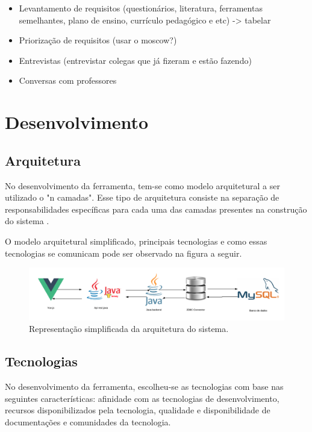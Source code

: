 \begin{itemize}
	\item Levantamento de requisitos (questionários, literatura, ferramentas semelhantes, plano de ensino, currículo pedagógico e etc) -> tabelar
	\item Priorização de requisitos (usar o moscow?)
	\item Entrevistas (entrevistar colegas que já fizeram e estão fazendo)
	\item Conversas com professores
\end{itemize}

\section{Desenvolvimento}

\subsection{Arquitetura}

No desenvolvimento da ferramenta, tem-se como modelo arquitetural a ser utilizado o "n camadas". Esse tipo
de arquitetura consiste na separação de responsabilidades específicas para cada uma das camadas presentes 
na construção do sistema \cite{MSF}.

O modelo arquitetural simplificado, principais tecnologias e como essas tecnologias se comunicam pode ser observado 
na figura a seguir.

\begin{figure}[h]
	\centering
	\includegraphics[keepaspectratio=true,scale=0.25]{figuras/arquitetura.png}
	\caption{Representação simplificada da arquitetura do sistema.}
	\label{arquitetura}
\end{figure}



\subsection{Tecnologias}

No desenvolvimento da ferramenta, escolheu-se as tecnologias com base nas seguintes características: afinidade
com as tecnologias de desenvolvimento, recursos disponibilizados pela tecnologia, qualidade e disponibilidade
de documentações e comunidades da tecnologia.

